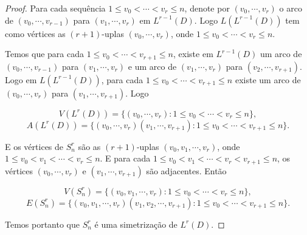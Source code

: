 \begin{proof}
Para cada sequência $1\leq v_0 < \cdots < v_{r} \leq n$, denote por $(v_0,\cdots,v_{r})$ o arco de $(v_0,\cdots,v_{r-1})$ para $(v_1,\cdots,v_r)$ em $L^{r-1}(D)$. Logo $L(L^{r-1}(D))$ tem como vértices as $(r+1)$-uplas $(v_0,\cdots,v_{r})$, onde $1\leq v_0 < \cdots < v_r \leq n$.

Temos que para cada $1\leq v_0 < \cdots < v_{r+1} \leq n$, existe em $L^{r-1}(D)$ um arco de $(v_0,\cdots,v_{r-1})$ para $(v_1,\cdots,v_r)$ e um arco de $(v_1,\cdots,v_{r})$ para $(v_2,\cdots,v_{r+1})$. Logo em $L(L^{r-1}(D))$, para cada $1\leq v_0 < \cdots < v_{r+1} \leq n$ existe um arco de $(v_0,\cdots,v_{r})$ para $(v_1,\cdots,v_{r+1})$. Logo

\[V(L^r(D)) = \{(v_0,\cdots,v_{r}) : 1\leq v_0 < \cdots < v_r \leq n\},\]
\[A(L^r(D)) = \{(v_0,\cdots,v_{r})(v_1,\cdots,v_{r+1}) : 1\leq v_0 < \cdots < v_{r+1} \leq n\}.\]

E os vértices de $S_n^r$ são as $(r+1)$-uplas $(v_0, v_1, \cdots, v_r)$, onde $1\leq v_0 < v_1 < \cdots < v_r \leq n$. E para cada $1 \leq v_0 < v_1 <\cdots < v_r < v_{r+1} \leq n$, os vértices $(v_0, \cdots, v_r)$ e $(v_1, \cdots, v_{r+1})$ são adjacentes. Então 

\[V(S_n^r) = \{(v_0, v_1, \cdots, v_r) : 1 \leq v_0 < \cdots < v_r \leq n\},\]
\[E(S_n^r) = \{(v_0, v_1, \cdots, v_r)(v_1, v_2, \cdots, v_{r+1}) : 1 \leq v_0 < \cdots < v_{r+1} \leq n\}.\]




Temos portanto que $S_n^r$ é uma simetrização de $L^r(D)$.
\end{proof}

